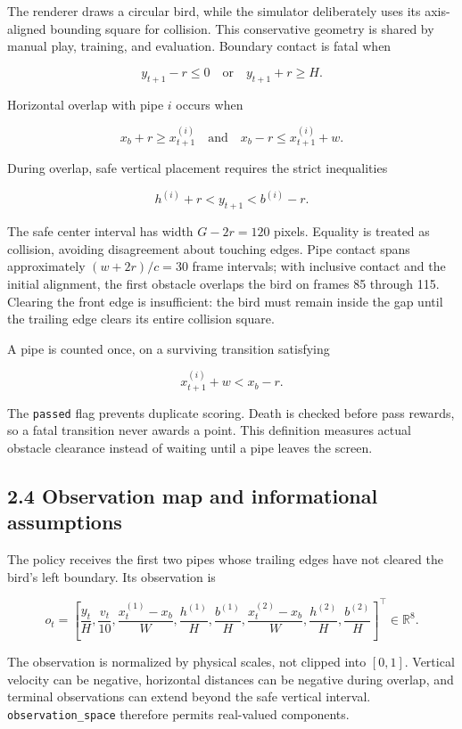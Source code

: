 \documentclass[
  11pt,
]{article}
\begin{document}
The renderer draws a circular bird, while the simulator deliberately
uses its axis-aligned bounding square for collision. This conservative
geometry is shared by manual play, training, and evaluation. Boundary
contact is fatal when

\[
y_{t+1}-r\le0\quad\text{or}\quad y_{t+1}+r\ge H.
\]

Horizontal overlap with pipe \(i\) occurs when

\[
x_b+r\ge x_{t+1}^{(i)}
\quad\text{and}\quad
x_b-r\le x_{t+1}^{(i)}+w.
\]

During overlap, safe vertical placement requires the strict inequalities

\[
h^{(i)}+r<y_{t+1}<b^{(i)}-r.
\]

The safe center interval has width \(G-2r=120\) pixels. Equality is
treated as collision, avoiding disagreement about touching edges. Pipe
contact spans approximately \((w+2r)/c=30\) frame intervals; with
inclusive contact and the initial alignment, the first obstacle overlaps
the bird on frames 85 through 115. Clearing the front edge is
insufficient: the bird must remain inside the gap until the trailing
edge clears its entire collision square.

A pipe is counted once, on a surviving transition satisfying

\[
x_{t+1}^{(i)}+w<x_b-r.
\]

The \texttt{passed} flag prevents duplicate scoring. Death is checked
before pass rewards, so a fatal transition never awards a point. This
definition measures actual obstacle clearance instead of waiting until a
pipe leaves the screen.

\subsection{2.4 Observation map and informational
assumptions}\label{observation-map-and-informational-assumptions}

The policy receives the first two pipes whose trailing edges have not
cleared the bird's left boundary. Its observation is

\[
o_t=\left[
\frac{y_t}{H},\frac{v_t}{10},
\frac{x_t^{(1)}-x_b}{W},\frac{h^{(1)}}H,\frac{b^{(1)}}H,
\frac{x_t^{(2)}-x_b}{W},\frac{h^{(2)}}H,\frac{b^{(2)}}H
\right]^\top\in\mathbb R^8.
\]

The observation is normalized by physical scales, not clipped into
\([0,1]\). Vertical velocity can be negative, horizontal distances can
be negative during overlap, and terminal observations can extend beyond
the safe vertical interval. \texttt{observation\_space} therefore
permits real-valued components.
\end{document}
